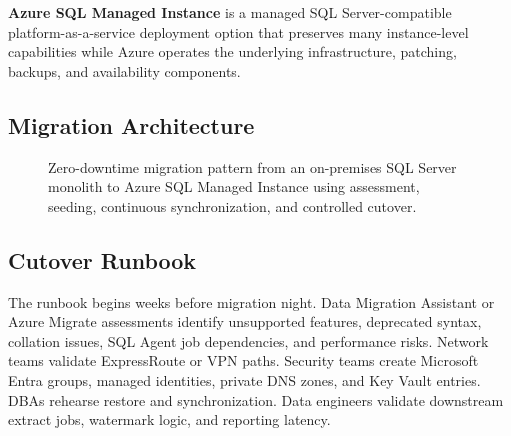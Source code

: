\begin{definitionbox}
\textbf{Azure SQL Managed Instance} is a managed SQL Server-compatible platform-as-a-service deployment option that preserves many instance-level capabilities while Azure operates the underlying infrastructure, patching, backups, and availability components.
\end{definitionbox}

\subsection{Migration Architecture}
\begin{figure}[H]
    \centering
    \caption{Zero-downtime migration pattern from an on-premises SQL Server monolith to Azure SQL Managed Instance using assessment, seeding, continuous synchronization, and controlled cutover.}
    \label{fig:sql-mi-migration}
\end{figure}

\subsection{Cutover Runbook}
The runbook begins weeks before migration night. Data Migration Assistant or Azure Migrate assessments identify unsupported features, deprecated syntax, collation issues, SQL Agent job dependencies, and performance risks. Network teams validate ExpressRoute or VPN paths. Security teams create Microsoft Entra groups, managed identities, private DNS zones, and Key Vault entries. DBAs rehearse restore and synchronization. Data engineers validate downstream extract jobs, watermark logic, and reporting latency.

